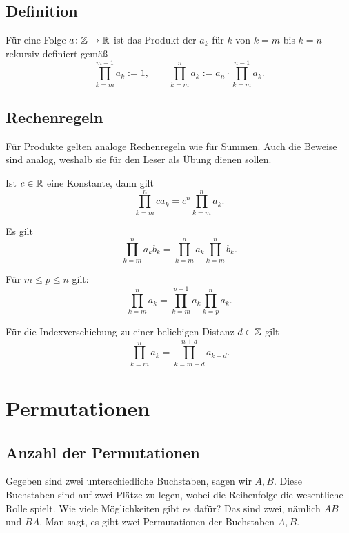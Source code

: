 \subsection{Definition}
\begin{Definition}[Produkt]
Für eine Folge $a\colon\mathbb Z\to\mathbb R$ ist das Produkt der $a_k$ für
$k$ von $k=m$ bis $k=n$ rekursiv definiert gemäß
\[\prod_{k=m}^{m-1} a_k := 1,\qquad
\prod_{k=m}^n a_k := a_n\cdot\prod_{k=m}^{n-1} a_k.\]
\end{Definition}

\subsection{Rechenregeln}
Für Produkte gelten analoge Rechenregeln wie für Summen. Auch
die Beweise sind analog, weshalb sie für den Leser als Übung
dienen sollen.
\begin{Satz}
Ist $c\in\mathbb R$ eine Konstante, dann gilt
\[\prod_{k=m}^n ca_k = c^n\prod_{k=m}^n a_k.\]
\end{Satz}
\begin{Satz}
Es gilt
\[\prod_{k=m}^n a_k b_k = \prod_{k=m}^n a_k \prod_{k=m}^n b_k.\]
\end{Satz}
\begin{Satz}\label{Prod-Aufteilung}
Für $m\le p\le n$ gilt:
\[\prod_{k=m}^n a_k = \prod_{k=m}^{p-1} a_k\prod_{k=p}^n a_k.\]
\end{Satz}
\begin{Satz}[Indexshift]\label{Prod-Indexshift}
Für die Indexverschiebung zu einer beliebigen Distanz $d\in\mathbb Z$ gilt
\[\prod_{k=m}^n a_k = \prod_{k=m+d}^{n+d} a_{k-d}.\]
\end{Satz}

\section{Permutationen}%

\subsection{Anzahl der Permutationen}

Gegeben sind zwei unterschiedliche Buchstaben, sagen wir $A,B$. Diese
Buchstaben sind auf zwei Plätze zu legen, wobei die Reihenfolge die
wesentliche Rolle spielt. Wie viele Möglichkeiten gibt es dafür?
Das sind zwei, nämlich $AB$ und $BA$. Man sagt, es gibt zwei
Permutationen der Buchstaben $A,B$.

